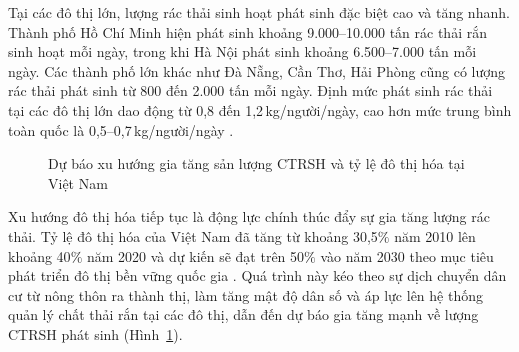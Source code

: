 \documentclass[../main.tex]{subfiles}
\begin{document}
Tại các đô thị lớn, lượng rác thải sinh hoạt phát sinh đặc biệt cao và tăng nhanh. Thành phố Hồ Chí Minh hiện phát sinh khoảng 9.000--10.000 tấn rác thải rắn sinh hoạt mỗi ngày, trong khi Hà Nội phát sinh khoảng 6.500--7.000 tấn mỗi ngày. Các thành phố lớn khác như Đà Nẵng, Cần Thơ, Hải Phòng cũng có lượng rác thải phát sinh từ 800 đến 2.000 tấn mỗi ngày. Định mức phát sinh rác thải tại các đô thị lớn dao động từ 0,8 đến 1,2\,kg/người/ngày, cao hơn mức trung bình toàn quốc là 0,5--0,7\,kg/người/ngày \cite{MONRE2020}.

\begin{figure}[htbp]
\centering
{}
\caption{Dự báo xu hướng gia tăng sản lượng CTRSH và tỷ lệ đô thị hóa tại Việt Nam}
\label{fig:xu-huong-rac-viet-nam}
\end{figure}

Xu hướng đô thị hóa tiếp tục là động lực chính thúc đẩy sự gia tăng lượng rác thải. Tỷ lệ đô thị hóa của Việt Nam đã tăng từ khoảng 30,5$\%$ năm 2010 lên khoảng 40$\%$ năm 2020 \cite{GSO2021} và dự kiến sẽ đạt trên 50$\%$ vào năm 2030 theo mục tiêu phát triển đô thị bền vững quốc gia \cite{NQ06_2022}. Quá trình này kéo theo sự dịch chuyển dân cư từ nông thôn ra thành thị, làm tăng mật độ dân số và áp lực lên hệ thống quản lý chất thải rắn tại các đô thị, dẫn đến dự báo gia tăng mạnh về lượng CTRSH phát sinh \cite{WorldBankVietnamWaste} (Hình~\ref{fig:xu-huong-rac-viet-nam}).
\end{document}

